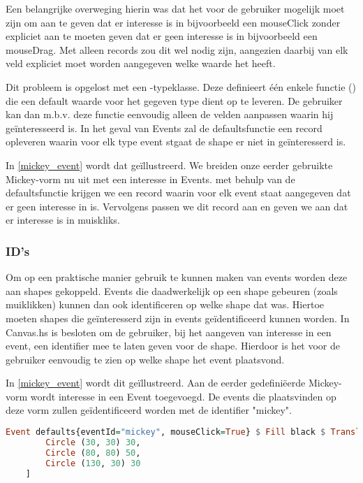 Een belangrijke overweging hierin was dat het voor de gebruiker mogelijk moet zijn om aan te geven dat er interesse is in bijvoorbeeld een mouseClick zonder expliciet aan te moeten geven dat er geen interesse is in bijvoorbeeld een mouseDrag. Met alleen records zou dit wel nodig zijn, aangezien daarbij van elk veld expliciet moet worden aangegeven welke waarde het heeft.

Dit probleem is opgelost met een -typeklasse. Deze definieert één enkele functie () die een default waarde voor het gegeven type dient op te leveren. De gebruiker kan dan m.b.v. deze functie eenvoudig alleen de velden aanpassen waarin hij geïnteresseerd is. In het geval van Events zal de defaultsfunctie een record opleveren waarin voor elk type event stgaat de shape er niet in geïnteresserd is. 

In \autoref{mickey_event} wordt dat geïllustreerd. We breiden onze eerder gebruikte Mickey-vorm nu uit met een interesse in Events. met behulp van de defaultsfunctie krijgen we een record waarin voor elk event staat aangegeven dat er geen interesse in is. Vervolgens passen we dit record aan en geven we aan dat er interesse is in muiskliks.

\subsubsection{ID's}
Om op een praktische manier gebruik te kunnen maken van events worden deze aan shapes gekoppeld. Events die daadwerkelijk op een shape gebeuren (zoals muiklikken) kunnen dan ook identificeren op welke shape dat was. Hiertoe moeten shapes die geïnteresserd zijn in events geïdentificeerd kunnen worden. In Canvas.hs is besloten om de gebruiker, bij het aangeven van interesse in een event, een identifier mee te laten geven voor de shape. Hierdoor is het voor de gebruiker eenvoudig te zien op welke shape het event plaatsvond.

In \autoref{mickey_event} wordt dit geïllustreerd. Aan de eerder gedefiniëerde Mickey-vorm wordt interesse in een Event toegevoegd. De events die plaatsvinden op deze vorm zullen geïdentificeerd worden met de identifier "mickey".

\begin{lstlisting}[style=densecode, language=Haskell, caption=Mickey-figuur met interesse in een Event, label=mickey_event]
Event defaults{eventId="mickey", mouseClick=True} $ Fill black $ Translate 100 100 $ Rotate 90 $ Offset (80, 65) $ Container 160 130 [
        Circle (30, 30) 30,
        Circle (80, 80) 50,
        Circle (130, 30) 30
    ]
\end{lstlisting}


